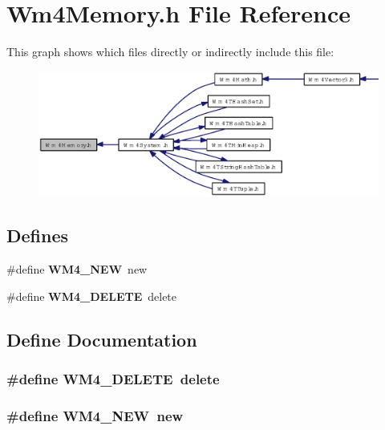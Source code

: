 \section{Wm4Memory.h File Reference}
\label{Wm4Memory_8h}


This graph shows which files directly or indirectly include this file:\begin{figure}[H]
\begin{center}
\leavevmode
\includegraphics[width=348pt]{Wm4Memory_8h__dep__incl}
\end{center}
\end{figure}
\subsection*{Defines}
\begin{CompactItemize}
\item 
\#define {\bf WM4\_\-NEW}~new
\item 
\#define {\bf WM4\_\-DELETE}~delete
\end{CompactItemize}


\subsection{Define Documentation}
\subsubsection{\setlength{\rightskip}{0pt plus 5cm}\#define WM4\_\-DELETE~delete}\label{Wm4Memory_8h_2974c08e07adbe9a05404ba2856bfde0}


\subsubsection{\setlength{\rightskip}{0pt plus 5cm}\#define WM4\_\-NEW~new}\label{Wm4Memory_8h_01ad707ea009cff7a3567cdb6acf0588}


